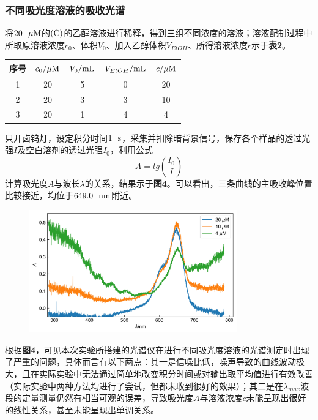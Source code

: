 \documentclass[12pt]{article}
\begin{document}
 \subsubsection{不同吸光度溶液的吸收光谱}
 将$20\ \ \mu{\rm M}$的${\rm(C)}$的乙醇溶液进行稀释，得到三组不同浓度的溶液；溶液配制过程中所取原溶液浓度$c_{0}$、体积$V_{0}$、加入乙醇体积$V_{EtOH}$、所得溶液浓度$c$示于\textbf{表2}。
 \begin{table}[h]
 	\centering
 	\begin{tabular}{ccccc}
 		\toprule
 		序号 & $c_{0}/\mu{\rm M}$ & $V_{0}/{\rm mL}$ & $V_{EtOH}/{\rm mL}$ & $c/\mu{\rm M}$  \\
 		\midrule
 		1 & 20 & 5 & 0 & 20 \\
 		2 & 20 & 3 & 3 & 10 \\
 		3 & 20 & 1 & 4 & 4 \\
 		\bottomrule
 	\end{tabular}
 \end{table}
 \par
 只开卤钨灯，设定积分时间$1\ \ {\rm s}$，采集并扣除暗背景信号，保存各个样品的透过光强$I$及空白溶剂的透过光强$I_{0}$，利用公式
 $$
 A=lg(\frac{I_{0}}{I})
 $$
 计算吸光度$A$与波长$\lambda$的关系，结果示于\textbf{图4}。可以看出，三条曲线的主吸收峰位置比较接近，均位于$649.0\ \ {\rm nm}$附近。
 \begin{figure}[h]
 	\centering
 	\includegraphics[width=0.8\textwidth]{4.jpg}
 \end{figure}
 \par
 根据\textbf{图4}，可见本次实验所搭建的光谱仪在进行不同吸光度溶液的光谱测定时出现了严重的问题，具体而言有以下两点：其一是信噪比低，噪声导致的曲线波动极大，且在实际实验中无法通过简单地改变积分时间或对输出取平均值进行有效改善（实际实验中两种方法均进行了尝试，但都未收到很好的效果）；其二是在$\lambda_{max}$波段的定量测量仍然有相当可观的误差，导致吸光度$A$与溶液浓度$c$未能呈现出很好的线性关系，甚至未能呈现出单调关系。\par
\end{document}
